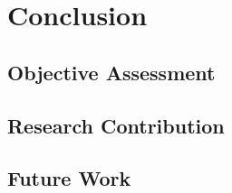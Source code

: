 \chapter{Conclusion}
\section{Objective Assessment}
\section{Research Contribution}
\section{Future Work}

